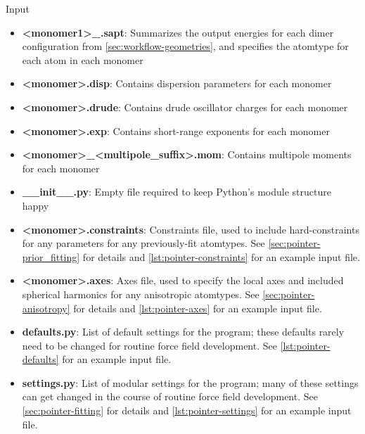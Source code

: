 \begin{subsection}{Input}
\begin{itemize}
\item \textbf{<monomer1>\_<monomer2>.sapt}:
Summarizes the output \sapt energies for each dimer configuration from
\cref{sec:workflow-geometries}, and specifies the atomtype for each atom in
each monomer 
\item \textbf{<monomer>.disp}:
Contains dispersion parameters for each monomer
\item \textbf{<monomer>.drude}:
Contains drude oscillator charges for each monomer
\item \textbf{<monomer>.exp}:
Contains short-range exponents for each monomer
\item \textbf{<monomer>\_<multipole\_suffix>.mom}:
Contains multipole moments for each monomer
\item \textbf{\_\_init\_\_.py}:
Empty file required to keep Python's module structure happy
\item \textcolor{codegreen}{\textbf{<monomer>.constraints}:}
Constraints file, used to include hard-constraints for any \A parameters
for any previously-fit atomtypes. See \cref{sec:pointer-prior_fitting} for
details and \cref{lst:pointer-constraints} for an example input file.
\item \textcolor{codegreen}{\textbf{<monomer>.axes}:}
Axes file, used to specify the local axes and included spherical harmonics for
any anisotropic atomtypes. See \cref{sec:pointer-anisotropy} for details and
\cref{lst:pointer-axes} for an example input file.
\item \textcolor{codegreen}{\textbf{defaults.py}:}
List of default settings for the \pointer program; these defaults rarely need
to be changed for routine force field development. 
See \cref{lst:pointer-defaults} for an example input file.
\item \textcolor{codepurple}{\textbf{settings.py}:}
List of modular settings for the \pointer program; many of these settings can
get changed in the course of routine force field development.  See
\cref{sec:pointer-fitting} for details and \cref{lst:pointer-settings} for
an example input file.
\end{itemize}

\end{subsection}

